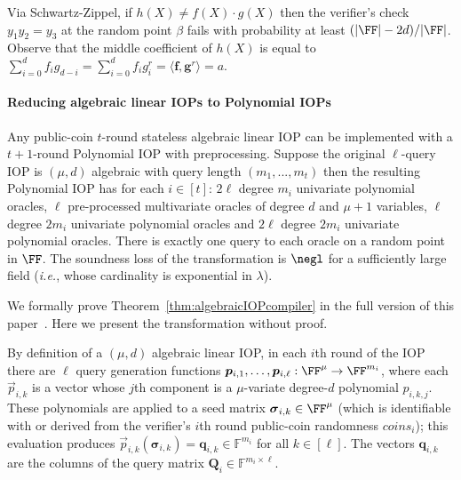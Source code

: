 Via Schwartz-Zippel, if $h(X) \neq f(X) \cdot g(X)$ then the verifier's check $y_1 y_2 = y_3$ at the random point $\beta$ fails with probability at least $(|\FF| - 2d)/|\FF|$. %
Observe that the middle coefficient of $h(X)$ is equal to $\sum_{i=0}^d f_i g_{d-i} = \sum_{i=0}^d f_i g^r_i = \langle \mathbf{f}, \mathbf{g}^r \rangle = a$.
\fi

\paragraph{Reducing algebraic linear IOPs to Polynomial IOPs} 
\label{sec:algebraicIOP}

\begin{theorem}\label{thm:algebraicIOPcompiler}
Any public-coin $t$-round stateless algebraic linear IOP can be implemented with a $t+1$-round Polynomial IOP with preprocessing. Suppose the original $\ell$-query IOP is $(\mu,d)$ algebraic with query length $(m_1,...,m_t)$ then the resulting Polynomial IOP has for each $i \in [t]$: $2\ell$ degree $m_i$ univariate polynomial oracles, $\ell$ pre-processed multivariate oracles of degree $d$ and $\mu+1$ variables, $\ell$ degree $2m_i$ univariate polynomial oracles %
and $2\ell$ degree $2m_i$ univariate polynomial oracles. %
There is exactly one query to each oracle on a random point in $\FF$. The soundness loss of the transformation is $\negl$ for a sufficiently large field (\emph{i.e.}, whose cardinality is exponential in $\lambda$).
\end{theorem}

We formally prove Theorem~\ref{thm:algebraicIOPcompiler} in the full version of this paper~\cite{DARK/Supersonic:fullversion}. Here we present the transformation without proof.

By definition of a $(\mu, d)$ algebraic linear IOP, in each $i$th round of the IOP there are $\ell$ query generation functions $\vec{p}_{i,1},\ldots,\vec{p}_{i,\ell}: \FF^\mu \rightarrow \FF^{m_i}$, where each $\vec{p}_{i,k}$ is a vector whose $j$th component is a $\mu$-variate degree-$d$ polynomial $p_{i,k,j}$. These polynomials are applied to a seed matrix $\boldsymbol{\sigma}_{i,k} \in \FF^\mu$ (which is identifiable with or derived from the verifier's $i$th round public-coin randomness $\mathit{coins}_i$); this evaluation produces $\vec{p}_{i,k}(\boldsymbol{\sigma}_{i,k}) = \mathbf{q}_{i,k} \in \mathbb{F}^{m_i}$ for all $k \in [\ell]$. The vectors $\mathbf{q}_{i,k}$ are the columns of the query matrix $\mathbf{Q}_i \in \mathbb{F}^{m_i \times \ell}$.

